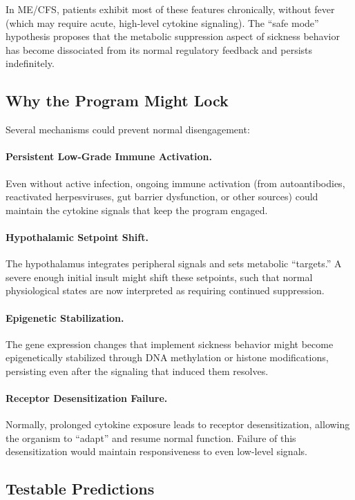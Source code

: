 In ME/CFS, patients exhibit most of these features chronically, without fever (which may require acute, high-level cytokine signaling). The ``safe mode'' hypothesis proposes that the metabolic suppression aspect of sickness behavior has become dissociated from its normal regulatory feedback and persists indefinitely.

\subsection{Why the Program Might Lock}

Several mechanisms could prevent normal disengagement:

\paragraph{Persistent Low-Grade Immune Activation.} Even without active infection, ongoing immune activation (from autoantibodies, reactivated herpesviruses, gut barrier dysfunction, or other sources) could maintain the cytokine signals that keep the program engaged.

\paragraph{Hypothalamic Setpoint Shift.} The hypothalamus integrates peripheral signals and sets metabolic ``targets.'' A severe enough initial insult might shift these setpoints, such that normal physiological states are now interpreted as requiring continued suppression.

\paragraph{Epigenetic Stabilization.} The gene expression changes that implement sickness behavior might become epigenetically stabilized through DNA methylation or histone modifications, persisting even after the signaling that induced them resolves.

\paragraph{Receptor Desensitization Failure.} Normally, prolonged cytokine exposure leads to receptor desensitization, allowing the organism to ``adapt'' and resume normal function. Failure of this desensitization would maintain responsiveness to even low-level signals.

\subsection{Testable Predictions}

